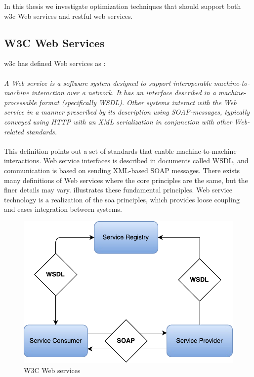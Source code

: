 In this thesis we investigate optimization techniques that should support both
\gls{w3c} Web services and \gls{rest}ful web services.

\subsection{W3C Web Services}

\gls{w3c} has defined Web services as \cite{wrc-web-service}:

\paragraph{}
\textit{
    A Web service is a software system designed to support interoperable
    machine-to-machine interaction over a network. It has an interface described in
    a machine-processable format (specifically WSDL). Other systems interact with
    the Web service in a manner prescribed by its description using SOAP-messages,
    typically conveyed using HTTP with an XML serialization in conjunction with
    other Web-related standards.
}

\paragraph{}

This definition points out a set of standards that enable machine-to-machine
interactions. Web service interfaces is described in documents called WSDL, and
communication is based on sending XML-based SOAP messages. There exists many
definitions of Web services where the core principles are the same, but the
finer details may vary.  illustrates these
fundamental principles. Web service technology is a realization of the \gls{soa}
principles, which provides loose coupling and eases integration between systems.

\begin{figure}[h]
\centering
\includegraphics[scale=0.6]{images/web_services.pdf}
\caption{W3C Web services}
\label{figure-w3c-web-services}
\end{figure}

